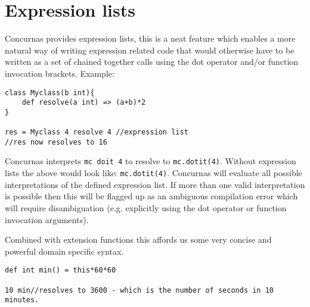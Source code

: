 \documentclass[conc-doc]{subfiles}
\begin{document}
	
	\chapter[Expression lists]{Expression lists}
	\label{ch:exprLists}


Concurnas provides expression lists, this is a neat feature which enables a more natural way of writing expression related code that would otherwise have to be written as a set of chained together calls using the dot operator and/or function invocation brackets. Example:
\begin{lstlisting}
class Myclass(b int){
	def resolve(a int) => (a+b)*2
}

res = Myclass 4 resolve 4 //expression list
//res now resolves to 16
\end{lstlisting}

Concurnas interprets \lstinline{mc doit 4} to resolve to \lstinline{mc.dotit(4)}. Without expression lists the above would look like: \lstinline{mc.dotit(4)}. Concurnas will evaluate all possible interpretations of the defined expression list. If more than one valid interpretation is possible then this will be flagged up as an ambiguous compilation error which will require disambiguation (e.g. explicitly using the dot operator or function invocation arguments).

Combined with extension functions this affords us some very concise and powerful domain specific syntax.
\begin{lstlisting}
def int min() = this*60*60

10 min//resolves to 3600 - which is the number of seconds in 10 minutes.
\end{lstlisting}
\end{document}
